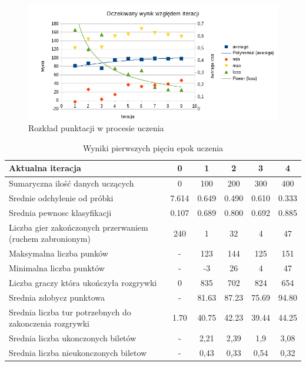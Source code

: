 \documentclass[12pt, oneside]{report}
\begin{document}
\begin{figure}
	\includegraphics{WykresPunktowPosteIteracji.png}
	\caption{Rozkład punktacji w procesie uczenia}
	\label{figure:learn_results}
\end{figure}

\begin{table}[h]
	\begin{center}
		\begin{tabular}{| p{6cm} | c | c | c | c | c |} \hline
			Aktualna iteracja & 0 & 1 & 2 & 3 & 4 \\ \hline
			Sumaryczna ilość danych uczących & 0 & 100 & 200 & 300 & 400 \\ \hline
			Srednie odchylenie od próbki & 7.614 & 0.649 & 0.490 & 0.610 & 0.333 \\ \hline
			Srednia pewnosc klasyfikacji & 0.107 & 0.689 & 0.800 & 0.692 & 0.885 \\ \hline
			Liczba gier zakończonych przerwaniem (ruchem zabronionym) & 240 & 1 & 32 & 4 & 47 \\ \hline
			Maksymalna liczba punków & - & 123 & 144 & 125 & 151 \\ \hline
			Minimalna liczba punktów & - & -3 & 26 & 4 & 47 \\ \hline
			Liczba graczy która ukończyła rozgrywki & 0 & 835 & 702 & 824 & 654 \\ \hline
			Srednia zdobycz punktowa & - & 81.63 & 87.23 & 75.69 & 94.80 \\ \hline
			Srednia liczba tur potrzebnych do zakonczenia rozgrywki & 1.70 & 40.75 & 42.23 & 39.44 & 44.25 \\ \hline
			Srednia liczba ukonczonych biletów & - & 2,21 & 2,39 & 1,9 & 3,08 \\ \hline
			Srednia liczba nieukonczonych biletow & - & 0,43 & 0,33 & 0,54 & 0,32 \\ \hline
		\end{tabular}	
		\caption{Wyniki pierwszych pięciu epok uczenia}
		\label{table:learn_metrics}
	\end{center}
\end{table}
\end{document}

